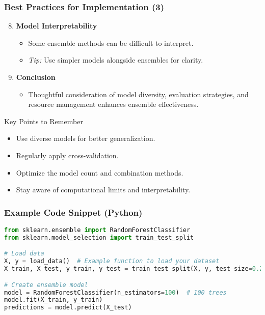 \documentclass[aspectratio=169]{beamer}
\begin{document}
\begin{frame}[fragile]
    \frametitle{Best Practices for Implementation (3)}
    \begin{enumerate}
        \setcounter{enumi}{7} %
        \item \textbf{Model Interpretability}
        \begin{itemize}
            \item Some ensemble methods can be difficult to interpret.
            \item \textit{Tip:} Use simpler models alongside ensembles for clarity.
        \end{itemize}
        
        \item \textbf{Conclusion}
        \begin{itemize}
            \item Thoughtful consideration of model diversity, evaluation strategies, and resource management enhances ensemble effectiveness.
        \end{itemize}
    \end{enumerate}
    
    \begin{block}{Key Points to Remember}
        \begin{itemize}
            \item Use diverse models for better generalization.
            \item Regularly apply cross-validation.
            \item Optimize the model count and combination methods.
            \item Stay aware of computational limits and interpretability.
        \end{itemize}
    \end{block}
\end{frame}

\begin{frame}[fragile]
    \frametitle{Example Code Snippet (Python)}
    \begin{lstlisting}[language=Python]
from sklearn.ensemble import RandomForestClassifier
from sklearn.model_selection import train_test_split

# Load data
X, y = load_data()  # Example function to load your dataset
X_train, X_test, y_train, y_test = train_test_split(X, y, test_size=0.2)

# Create ensemble model
model = RandomForestClassifier(n_estimators=100)  # 100 trees
model.fit(X_train, y_train)
predictions = model.predict(X_test)
    \end{lstlisting}
\end{frame}
\end{document}
